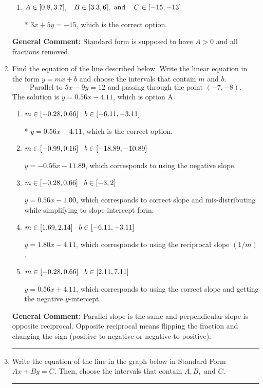 \documentclass{extbook}[14pt]
\newcommand{\litem}[1]{\item #1

\rule{\textwidth}{0.4pt}}
\begin{document}
\begin{enumerate}
{\begin{enumerate}[label=\Alph*.]
 $0.6x + 1y = -3.0$, which corresponds to not removing rational values for Standard Form.
\item \( A \in [0.8, 3.7], \hspace{3mm} B \in [3.3, 6], \text{ and } \hspace{3mm} C \in [-15, -13] \)

* $3x + 5y = -15$, which is the correct option.
\end{enumerate}

\textbf{General Comment:} Standard form is supposed to have $A > 0$ and all fractions removed.
}
\litem{
Find the equation of the line described below. Write the linear equation in the form $ y=mx+b $ and choose the intervals that contain $m$ and $b$.
\[ \text{Parallel to } 5 x - 9 y = 12 \text{ and passing through the point } (-7, -8). \]The solution is \( y = 0.56x - 4.11 \), which is option A.\begin{enumerate}[label=\Alph*.]
\item \( m \in [-0.28, 0.66] \hspace*{3mm} b \in [-6.11, -3.11] \)

* $y = 0.56x - 4.11$, which is the correct option.
\item \( m \in [-0.99, 0.16] \hspace*{3mm} b \in [-18.89, -10.89] \)

 $y = -0.56x - 11.89$, which corresponds to using the negative slope.
\item \( m \in [-0.28, 0.66] \hspace*{3mm} b \in [-3, 2] \)

 $y = 0.56x - 1.00$, which corresponds to correct slope and mis-distributing while simplifying to slope-intercept form.
\item \( m \in [1.69, 2.14] \hspace*{3mm} b \in [-6.11, -3.11] \)

 $y = 1.80x - 4.11$, which corresponds to using the reciprocal slope $(1/m)$.
\item \( m \in [-0.28, 0.66] \hspace*{3mm} b \in [2.11, 7.11] \)

 $y = 0.56x + 4.11$, which corresponds to using the correct slope and getting the negative $y$-intercept.
\end{enumerate}

\textbf{General Comment:} Parallel slope is the same and perpendicular slope is opposite reciprocal. Opposite reciprocal means flipping the fraction and changing the sign (positive to negative or negative to positive).
}
\litem{
Write the equation of the line in the graph below in Standard Form $Ax+By=C$. Then, choose the intervals that contain $A, B, \text{ and } C$.

}
\end{enumerate}
\end{document}
